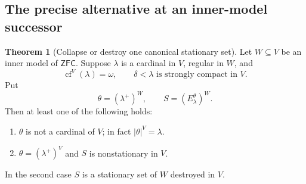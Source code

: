 \documentclass[11pt,letterpaper]{article}
\theoremstyle{definition}
\newtheorem{theorem}[definition]{Theorem}
\numberwithin{equation}{section}
\newcommand{\ZFC}{\mathsf{ZFC}}
\newcommand{\cf}{\operatorname{cf}}
\begin{document}
\subsection{The precise alternative at an inner-model successor}

\begin{samepage}
\begin{theorem}[Collapse or destroy one canonical stationary set]\label{thm:successor}
Let $W\subseteq V$ be an inner model of $\ZFC$. Suppose $\lambda$ is a cardinal in $V$, regular in $W$, and
\[
\cf^V(\lambda)=\omega,
\qquad
\delta<\lambda\text{ is strongly compact in }V.
\]
Put
\[
\theta=(\lambda^+)^W,
\qquad
S=(E^\theta_\lambda)^W.
\]
Then at least one of the following holds:
\begin{enumerate}
\item $\theta$ is not a cardinal of $V$; in fact $|\theta|^V=\lambda$.
\item $\theta=(\lambda^+)^V$ and $S$ is nonstationary in $V$.
\end{enumerate}
In the second case $S$ is a stationary set of $W$ destroyed in $V$.
\end{theorem}
\end{samepage}
\end{document}
